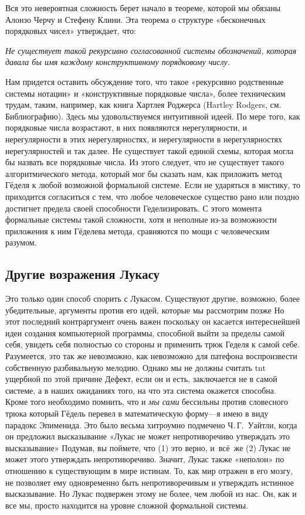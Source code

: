 \documentclass[../main.tex]{subfiles}
\begin{document}
Вся это невероятная сложность берет начало в теореме, которой мы обязаны Алонзо Черчу и Стефену Клини. Эта теорема о структуре «бесконечных порядковых чисел» утверждает, что:

\emph{Не существует такой рекурсивно согласованной системы обозначений, которая давала бы имя каждому конструктивному порядковому числу.}

Нам придется оставить обсуждение того, что такое «рекурсивно родственные системы нотации» и «конструктивные порядковые числа», более техническим трудам, таким, например, как книга Хартлея Роджерса (Hartley Rodgers, см. Библиографию). Здесь мы удовольствуемся интуитивной идеей. По мере того, как порядковые числа возрастают, в них появляются нерегулярности, и нерегулярности в этих нерегулярностях, и нерегулярности в нерегулярностях нерегулярностей и так далее. Не существует такой единой схемы, которая могла бы назвать все порядковые числа. Из этого следует, что не существует такого алгоритмического метода, который мог бы сказать нам, как приложить метод Гёделя к любой возможной формальной системе. Если не ударяться в мистику, то приходится согласиться с тем, что любое человеческое существо рано или поздно достигнет предела своей способности Геделизировать. С этого момента формальные системы такой сложности, хотя и неполные из-за возможности приложения к ним Гёделева метода, сравняются по мощи с человеческим разумом.


\subsection{Другие возражения Лукасу}

Это только один способ спорить с Лукасом. Существуют другие, возможно, более убедительные, аргументы против его идей, которые мы рассмотрим позже Но этот последний контраргумент очень важен поскольку он касается интереснейшей идеи создания компьютерной программы, способной выйти за пределы самой себя, увидеть себя полностью со стороны и применить трюк Геделя к самой себе. Разумеется, это так же невозможно, как невозможно для патефона воспроизвести собственную разбивальную мелодию. Однако мы не должны считать \acs{tnt} ущербной по этой причине Дефект, если он и есть, заключается не в самой системе, а в наших ожиданиях того, на что эта система окажется способна. Кроме того необходимо помнить, что и \emph{мы сами} бессильны против словесного трюка который Гёдель перевел в математическую форму---я имею в виду парадокс Эпименида. Это было весьма хитроумно подмечено Ч.\,Г.~Уайтли, когда он предложил высказывание «Лукас не может непротиворечиво утверждать это высказывание» Подумав, вы поймете, что (1) это верно, и~всё~же (2) Лукас не может этого утверждать непротиворечиво. Значит, Лукас также «неполон» по отношению к существующим в мире истинам. То, как мир отражен в его мозгу, не позволяет ему одновременно быть непротиворечивым и утверждать истинное высказывание. Но Лукас подвержен этому не более, чем любой из нас. Он, как и все мы, просто находится на уровне сложной формальной системы.
\end{document}
